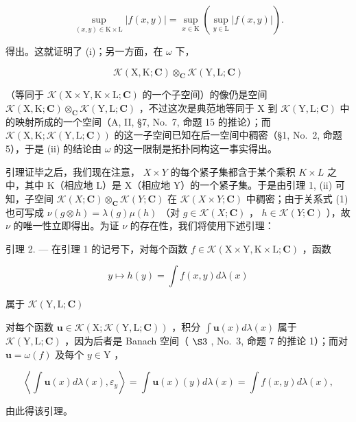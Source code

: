 \[
\sup _ {(x, y) \in \mathrm{K} \times \mathrm{L}} | f (x, y) | = \sup _ {x \in \mathrm{K}} \left(\sup _ {y \in \mathrm{L}} | f (x, y) |\right).
\]

得出。这就证明了 (i)；另一方面，在 \(\omega\) 下，

\[
\mathcal {K} (\mathrm{X}, \mathrm{K}; \mathbf {C}) \otimes_ {\mathbf {C}} \mathcal {K} (\mathrm{Y}, \mathrm{L}; \mathbf {C})
\]

（等同于 \(\mathcal{K}(\mathrm{X}\times \mathrm{Y},\mathrm{K}\times \mathrm{L};\mathbf{C})\) 的一个子空间）的像仍是空间 \(\mathcal{K}(\mathrm{X},\mathrm{K};\mathbf{C})\otimes_{\mathbf{C}}\mathcal{K}(\mathrm{Y},\mathrm{L};\mathbf{C})\) ，不过这次是典范地等同于 X 到 \(\mathcal{K}(\mathrm{Y},\mathrm{L};\mathbf{C})\) 中的映射所成的一个空间（A, II, §7, No.~7, 命题 15 的推论）；而 \(\mathcal{K}(\mathrm{X},\mathrm{K};\mathcal{K}(\mathrm{Y},\mathrm{L};\mathbf{C}))\) 的这一子空间已知在后一空间中稠密（§1, No.~2, 命题 5），于是 (ii) 的结论由 \(\omega\) 的这一限制是拓扑同构这一事实得出。

引理证毕之后，我们现在注意， \(X \times Y\) 的每个紧子集都含于某个乘积 \(K \times L\) 之中，其中 K（相应地 L）是 X（相应地 Y）的一个紧子集。于是由引理 1, (ii) 可知，子空间 \(\mathcal{K}(X; \mathbf{C}) \otimes_{\mathbf{C}} \mathcal{K}(Y; \mathbf{C})\) 在 \(\mathcal{K}(X \times Y; \mathbf{C})\) 中稠密；由于关系式 (1) 也可写成 \(\nu(g \otimes h) = \lambda(g)\mu(h)\) （对 \(g \in \mathcal{K}(X; \mathbf{C})\) ， \(h \in \mathcal{K}(Y; \mathbf{C})\) ），故 \(\nu\) 的唯一性立即得出。为证 \(\nu\) 的存在性，我们将使用下述引理：

引理 2. --- 在引理 1 的记号下，对每个函数 \(f \in \mathcal{K}(\mathrm{X} \times \mathrm{Y}, \mathrm{K} \times \mathrm{L}; \mathbf{C})\) ，函数

\[
y \mapsto h (y) = \int f (x, y) d \lambda (x)\tag{2}
\]

属于 \(\mathcal{K}(\mathrm{Y},\mathrm{L};\mathbf{C})\)

对每个函数 \(\mathbf{u} \in \mathcal{K}(\mathrm{X};\mathcal{K}(\mathrm{Y},\mathrm{L};\mathbf{C}))\) ，积分 \(\int \mathbf{u}(x)d\lambda (x)\) 属于 \(\mathcal{K}(\mathrm{Y},\mathrm{L};\mathbf{C})\) ，因为后者是 Banach 空间（ \(\S 3\) , No.~3, 命题 7 的推论 1）；而对 \(\mathbf{u} = \omega(f)\) 及每个 \(y \in \mathrm{Y}\) ，

\[
\left\langle \int \mathbf {u} (x) d \lambda (x), \varepsilon_ {y} \right\rangle = \int \mathbf {u} (x) (y) d \lambda (x) = \int f (x, y) d \lambda (x),
\]

由此得该引理。

